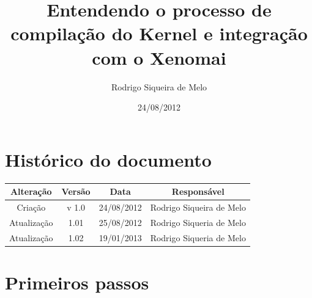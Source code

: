 \documentclass[a4paper,10pt]{article}
\title{Entendendo o processo de compilação do Kernel e integração com o Xenomai}
\author{Rodrigo Siqueira de Melo}
\date{24/08/2012}
\begin{document}
\maketitle
\titlepage
\tableofcontents

\newpage
\section{Histórico do documento}
\begin{center}
 \begin{tabular}{|c|c|c|c|}
  \hline
  Alteração & Versão & Data & Responsável\\
  \hline
  Criação  & v 1.0 & 24/08/2012 & Rodrigo Siqueira de Melo\\
  \hline
  Atualização & 1.01 & 25/08/2012 & Rodrigo Siqueria de Melo\\
  \hline
  Atualização & 1.02 & 19/01/2013 & Rodrigo Siqueria de Melo\\
  \hline
 \end{tabular}
\end{center}

\newpage
\section{Primeiros passos}
\end{document}
